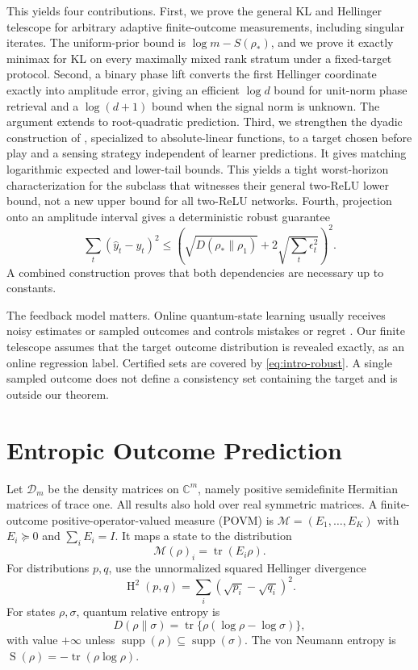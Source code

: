 \documentclass[twoside]{article}
\newcommand{\Dens}{\mathcal D}
\newcommand{\M}{\mathcal M}
\newcommand{\tr}{\operatorname{tr}}
\newcommand{\supp}{\operatorname{supp}}
\newcommand{\Hsq}{\operatorname{H}^2}
\newcommand{\Ent}{\operatorname{S}}
\begin{document}
This yields four contributions. First, we prove the general KL and Hellinger telescope for arbitrary adaptive finite-outcome measurements, including singular iterates. The uniform-prior bound is $\log m-S(\rho_*)$, and we prove it exactly minimax for KL on every maximally mixed rank stratum under a fixed-target protocol. Second, a binary phase lift converts the first Hellinger coordinate exactly into amplitude error, giving an efficient $\log d$ bound for unit-norm phase retrieval and a $\log(d+1)$ bound when the signal norm is unknown. The argument extends to root-quadratic prediction. Third, we strengthen the dyadic construction of \citet{doronarad2026online}, specialized to absolute-linear functions, to a target chosen before play and a sensing strategy independent of learner predictions. It gives matching logarithmic expected and lower-tail bounds. This yields a tight worst-horizon characterization for the subclass that witnesses their general two-ReLU lower bound, not a new upper bound for all two-ReLU networks. Fourth, projection onto an amplitude interval gives a deterministic robust guarantee
\begin{equation}
\sum_t(\widehat y_t-y_t)^2
\leq\left(\sqrt{D(\rho_*\|\rho_1)}+2\sqrt{\sum_t\epsilon_t^2}\right)^2.
\label{eq:intro-robust}
\end{equation}
A combined construction proves that both dependencies are necessary up to constants.

The feedback model matters. Online quantum-state learning usually receives noisy estimates or sampled outcomes and controls mistakes or regret \citep{aaronson2018online,chen2020practical,yang2020revisiting,meyer2025pure}. Our finite telescope assumes that the target outcome distribution is revealed exactly, as an online regression label. Certified sets are covered by \eqref{eq:intro-robust}. A single sampled outcome does not define a consistency set containing the target and is outside our theorem.

\section{Entropic Outcome Prediction}
\label{sec:quantum}

Let $\Dens_m$ be the density matrices on $\mathbb C^m$, namely positive semidefinite Hermitian matrices of trace one. All results also hold over real symmetric matrices. A finite-outcome positive-operator-valued measure (POVM) is $\M=(E_1,\ldots,E_K)$ with $E_i\succeq0$ and $\sum_iE_i=I$. It maps a state to the distribution
\begin{equation}
\M(\rho)_i=\tr(E_i\rho).
\end{equation}
For distributions $p,q$, use the unnormalized squared Hellinger divergence
\begin{equation}
\Hsq(p,q)=\sum_i(\sqrt{p_i}-\sqrt{q_i})^2.
\label{eq:hellinger}
\end{equation}
For states $\rho,\sigma$, quantum relative entropy is
\begin{equation}
D(\rho\|\sigma)=\tr\{\rho(\log\rho-\log\sigma)\},
\label{eq:qre}
\end{equation}
with value $+\infty$ unless $\supp(\rho)\subseteq\supp(\sigma)$. The von Neumann entropy is $\Ent(\rho)=-\tr(\rho\log\rho)$.
\end{document}
